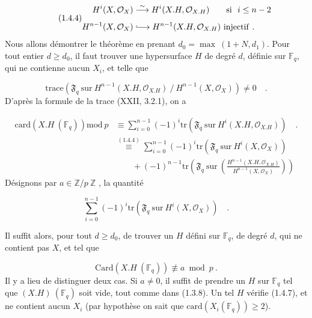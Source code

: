 \begin{equation}\tag{1.4.4}
\begin{aligned} H^i(X,\mathcal{O}_X) &\stackrel{\sim}{\longrightarrow} H^i(X.H,\mathcal{O}_{X.H}) \qquad \mathrm{si}\ \ i \leq n - 2 \\[1ex] H^{n-1}(X,\mathcal{O}_X) &\lhook\joinrel\longrightarrow H^{n-1}(X.H,\mathcal{O}_{X.H})\ \mathrm{injectif}\ . \end{aligned}
\end{equation}
Nous allons démontrer le théorème en prenant $d_0 = \max\ (1+N,d_1)$. Pour tout entier $d \geq d_0$, il faut trouver une hypersurface $H$ de degré $d$, définie sur $\mathbb{F}_q$, qui ne contienne aucun $X_i$, et telle que

\begin{equation}\tag{1.4.5}
\mathrm{trace}(\mathfrak{F}_q\ \mathrm{sur}\ H^{n-1}(X.H,\mathcal{O}_{X.H})\ /\ H^{n-1}(X,\mathcal{O}_X)) \neq 0 \quad .
\end{equation}
D'après la formule de la trace (XXII, 3.2.1), on a

\begin{equation}\tag{1.4.6}
\begin{aligned}
\mathrm{card}(X.H\ (\mathbb{F}_q))\mathrm{mod}\ p
&\equiv \sum_{i=0}^{n-1}(-1)^i
\mathrm{tr}(\mathfrak{F}_q\ \mathrm{sur}\ H^i(X.H,\mathcal{O}_{X.H})) \quad . \\
&\stackrel{(1.4.4)}{\equiv} \sum_{i=0}^{n-1}(-1)^i
\mathrm{tr}(\mathfrak{F}_q\ \mathrm{sur}\ H^i(X,\mathcal{O}_X)) \\
&\qquad +(-1)^{n-1}\mathrm{tr}\!\left(\mathfrak{F}_q\ \mathrm{sur}\
\left(\frac{H^{n-1}(X.H,\mathcal{O}_{X.H})}{H^{n-1}(X,\mathcal{O}_X)}\right)\right)
\end{aligned}
\end{equation}
Désignons par $a \in \mathbb{Z}/p\ \mathbb{Z}$ , la quantité

\begin{equation*}
\sum_{i=0}^{n-1} (-1)^i \mathrm{tr}(\mathfrak{F}_q\ \mathrm{sur}\ H^i(X,\mathcal{O}_X)) \quad .
\end{equation*}


Il suffit alors, pour tout $d \geq d_0$, de trouver un $H$ défini sur $\mathbb{F}_q$, de degré $d$, qui ne contient pas $X$, et tel que

\begin{equation}\tag{1.4.7}
\mathrm{Card}(X.H\ (\mathbb{F}_q)) \not\equiv a \bmod p \ .
\end{equation}
Il y a lieu de distinguer deux cas. Si $a \neq 0$, il suffit de prendre un $H$ sur $\mathbb{F}_q$ tel que $(X.H)\ (\mathbb{F}_q)$ soit vide, tout comme dans (1.3.8). Un tel $H$ vérifie (1.4.7), et ne contient aucun $X_i$ (par hypothèse on sait que $\mathrm{card}(X_i(\mathbb{F}_q)) \geq 2$).

